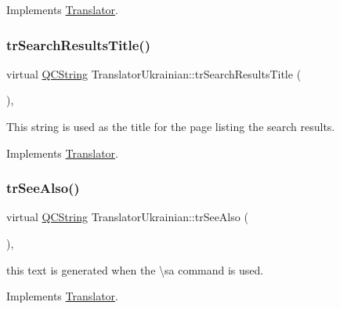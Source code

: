 Implements \mbox{\hyperlink{class_translator}{Translator}}.

\mbox{\label{class_translator_ukrainian_a135f713bf7a719f998e5731f2bf3c63d}} 
\subsubsection{\texorpdfstring{trSearchResultsTitle()}{trSearchResultsTitle()}}
{\footnotesize\ttfamily virtual \mbox{\hyperlink{class_q_c_string}{Q\+C\+String}} Translator\+Ukrainian\+::tr\+Search\+Results\+Title (\begin{DoxyParamCaption}{ }\end{DoxyParamCaption})\hspace{0.3cm}{\ttfamily [inline]}, {\ttfamily [virtual]}}

This string is used as the title for the page listing the search results. 

Implements \mbox{\hyperlink{class_translator}{Translator}}.

\mbox{\label{class_translator_ukrainian_ae46540cd65797122ef598f88f52d81d9}} 
\subsubsection{\texorpdfstring{trSeeAlso()}{trSeeAlso()}}
{\footnotesize\ttfamily virtual \mbox{\hyperlink{class_q_c_string}{Q\+C\+String}} Translator\+Ukrainian\+::tr\+See\+Also (\begin{DoxyParamCaption}{ }\end{DoxyParamCaption})\hspace{0.3cm}{\ttfamily [inline]}, {\ttfamily [virtual]}}

this text is generated when the \textbackslash{}sa command is used. 

Implements \mbox{\hyperlink{class_translator}{Translator}}.

\mbox{\label{class_translator_ukrainian_aec640e3c7bc9db35db62c2b2e3a00c5b}} 
